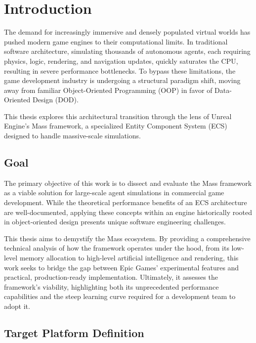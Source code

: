 \chapter{Introduction}
\label{sec:introduction}

The demand for increasingly immersive and densely populated virtual worlds has pushed modern game engines to their computational limits. In traditional software architecture, simulating thousands of autonomous agents, each requiring physics, logic, rendering, and navigation updates, quickly saturates the CPU, resulting in severe performance bottlenecks. To bypass these limitations, the game development industry is undergoing a structural paradigm shift, moving away from familiar Object-Oriented Programming (OOP) in favor of Data-Oriented Design (DOD).

This thesis explores this architectural transition through the lens of Unreal Engine’s Mass framework, a specialized Entity Component System (ECS) designed to handle massive-scale simulations.

\section[Goal]{Goal} %

The primary objective of this work is to dissect and evaluate the Mass framework as a viable solution for large-scale agent simulations in commercial game development. While the theoretical performance benefits of an ECS architecture are well-documented, applying these concepts within an engine historically rooted in object-oriented design presents unique software engineering challenges.

This thesis aims to demystify the Mass ecosystem. By providing a comprehensive technical analysis of how the framework operates under the hood, from its low-level memory allocation to high-level artificial intelligence and rendering, this work seeks to bridge the gap between Epic Games' experimental features and practical, production-ready implementation. Ultimately, it assesses the framework's viability, highlighting both its unprecedented performance capabilities and the steep learning curve required for a development team to adopt it.

\section[Target Platform Definition]{Target Platform Definition}

